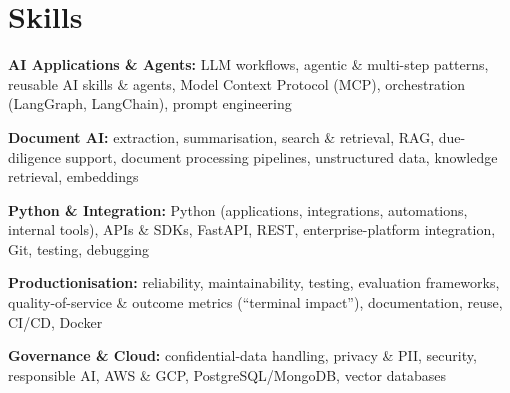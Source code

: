\documentclass[10pt,a4paper]{article}
\begin{document}
\section{Skills}
\begin{tight}
  \item[\textcolor{accent}{\small$\bullet$}] \textbf{AI Applications \& Agents:} LLM workflows, agentic \& multi-step patterns, reusable AI skills \& agents, Model Context Protocol (MCP), orchestration (LangGraph, LangChain), prompt engineering
  \item[\textcolor{accent}{\small$\bullet$}] \textbf{Document AI:} extraction, summarisation, search \& retrieval, RAG, due-diligence support, document processing pipelines, unstructured data, knowledge retrieval, embeddings
  \item[\textcolor{accent}{\small$\bullet$}] \textbf{Python \& Integration:} Python (applications, integrations, automations, internal tools), APIs \& SDKs, FastAPI, REST, enterprise-platform integration, Git, testing, debugging
  \item[\textcolor{accent}{\small$\bullet$}] \textbf{Productionisation:} reliability, maintainability, testing, evaluation frameworks, quality-of-service \& outcome metrics (``terminal impact''), documentation, reuse, CI/CD, Docker
  \item[\textcolor{accent}{\small$\bullet$}] \textbf{Governance \& Cloud:} confidential-data handling, privacy \& PII, security, responsible AI, AWS \& GCP, PostgreSQL/MongoDB, vector databases
\end{tight}

\end{document}
